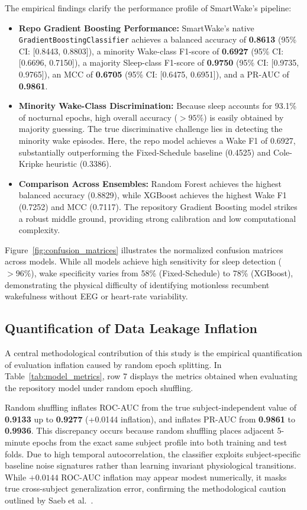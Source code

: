 \documentclass[journal,11pt,onecolumn]{IEEEtran}
\begin{document}
The empirical findings clarify the performance profile of SmartWake's pipeline:
\begin{itemize}[leftmargin=*]
    \item \textbf{Repo Gradient Boosting Performance:} SmartWake's native \texttt{GradientBoostingClassifier} achieves a balanced accuracy of \textbf{0.8613} (95\% CI: [0.8443, 0.8803]), a minority Wake-class F1-score of \textbf{0.6927} (95\% CI: [0.6696, 0.7150]), a majority Sleep-class F1-score of \textbf{0.9750} (95\% CI: [0.9735, 0.9765]), an MCC of \textbf{0.6705} (95\% CI: [0.6475, 0.6951]), and a PR-AUC of \textbf{0.9861}.
    \item \textbf{Minority Wake-Class Discrimination:} Because sleep accounts for 93.1\% of nocturnal epochs, high overall accuracy ($>95\%$) is easily obtained by majority guessing. The true discriminative challenge lies in detecting the minority wake episodes. Here, the repo model achieves a Wake F1 of 0.6927, substantially outperforming the Fixed-Schedule baseline (0.4525) and Cole-Kripke heuristic (0.3386).
    \item \textbf{Comparison Across Ensembles:} Random Forest achieves the highest balanced accuracy (0.8829), while XGBoost achieves the highest Wake F1 (0.7252) and MCC (0.7117). The repository Gradient Boosting model strikes a robust middle ground, providing strong calibration and low computational complexity.
\end{itemize}

Figure~\ref{fig:confusion_matrices} illustrates the normalized confusion matrices across models. While all models achieve high sensitivity for sleep detection ($>96\%$), wake specificity varies from 58\% (Fixed-Schedule) to 78\% (XGBoost), demonstrating the physical difficulty of identifying motionless recumbent wakefulness without EEG or heart-rate variability.

\subsection{Quantification of Data Leakage Inflation}
A central methodological contribution of this study is the empirical quantification of evaluation inflation caused by random epoch splitting. In Table~\ref{tab:model_metrics}, row 7 displays the metrics obtained when evaluating the repository model under random epoch shuffling. 

Random shuffling inflates ROC-AUC from the true subject-independent value of \textbf{0.9133} up to \textbf{0.9277} (+0.0144 inflation), and inflates PR-AUC from \textbf{0.9861} to \textbf{0.9936}. This discrepancy occurs because random shuffling places adjacent 5-minute epochs from the exact same subject profile into both training and test folds. Due to high temporal autocorrelation, the classifier exploits subject-specific baseline noise signatures rather than learning invariant physiological transitions. While $+0.0144$ ROC-AUC inflation may appear modest numerically, it masks true cross-subject generalization error, confirming the methodological caution outlined by Saeb et al.~\cite{saeb2017need}.
\end{document}
